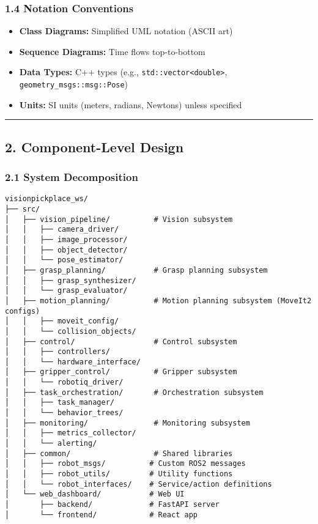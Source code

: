 \documentclass[
]{article}
\providecommand{\tightlist}{%
  \setlength{\itemsep}{0pt}\setlength{\parskip}{0pt}}
\begin{document}
\hypertarget{notation-conventions}{%
\subsubsection{1.4 Notation Conventions}\label{notation-conventions}}

\begin{itemize}
\tightlist
\item
  \textbf{Class Diagrams:} Simplified UML notation (ASCII art)
\item
  \textbf{Sequence Diagrams:} Time flows top-to-bottom
\item
  \textbf{Data Types:} C++ types (e.g.,
  \texttt{std::vector\textless{}double\textgreater{}},
  \texttt{geometry\_msgs::msg::Pose})
\item
  \textbf{Units:} SI units (meters, radians, Newtons) unless specified
\end{itemize}

\begin{center}\rule{0.5\linewidth}{0.5pt}\end{center}

\hypertarget{component-level-design}{%
\subsection{2. Component-Level Design}\label{component-level-design}}

\hypertarget{system-decomposition}{%
\subsubsection{2.1 System Decomposition}\label{system-decomposition}}

\begin{verbatim}
visionpickplace_ws/
├── src/
│   ├── vision_pipeline/          # Vision subsystem
│   │   ├── camera_driver/
│   │   ├── image_processor/
│   │   ├── object_detector/
│   │   └── pose_estimator/
│   ├── grasp_planning/           # Grasp planning subsystem
│   │   ├── grasp_synthesizer/
│   │   └── grasp_evaluator/
│   ├── motion_planning/          # Motion planning subsystem (MoveIt2 configs)
│   │   ├── moveit_config/
│   │   └── collision_objects/
│   ├── control/                  # Control subsystem
│   │   ├── controllers/
│   │   └── hardware_interface/
│   ├── gripper_control/          # Gripper subsystem
│   │   └── robotiq_driver/
│   ├── task_orchestration/       # Orchestration subsystem
│   │   ├── task_manager/
│   │   └── behavior_trees/
│   ├── monitoring/               # Monitoring subsystem
│   │   ├── metrics_collector/
│   │   └── alerting/
│   ├── common/                   # Shared libraries
│   │   ├── robot_msgs/          # Custom ROS2 messages
│   │   ├── robot_utils/         # Utility functions
│   │   └── robot_interfaces/    # Service/action definitions
│   └── web_dashboard/           # Web UI
│       ├── backend/             # FastAPI server
│       └── frontend/            # React app
\end{verbatim}
\end{document}
